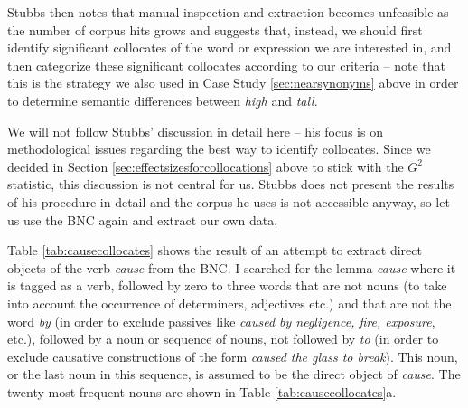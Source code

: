Stubbs then notes that manual inspection and extraction becomes unfeasible as the number of corpus hits grows and suggests that, instead, we should first identify significant collocates of the word or expression we are interested in, and then categorize these significant collocates according to our criteria -- note that this is the strategy we also used in Case Study \ref{sec:nearsynonyms} above in order to determine semantic differences between \textit{high} and \textit{tall}.

We will not follow Stubbs' discussion in detail here -- his focus is on methodological issues regarding the best way to identify collocates. Since we decided in Section \ref{sec:effectsizesforcollocations} above to stick with the $G^2$ statistic, this discussion is not central for us. Stubbs does not present the results of his procedure in detail and the corpus he uses is not accessible anyway, so let us use the BNC again and extract our own data.

Table \ref{tab:causecollocates} shows the result of an attempt to extract direct objects of the verb \textit{cause} from the BNC. I searched for the lemma \textit{cause} where it is tagged as a verb, followed by zero to three words that are not nouns (to take into account the occurrence of determiners, adjectives etc.) and that are not the word \textit{by} (in order to exclude passives like \textit{caused by negligence, fire, exposure}, etc.), followed by a noun or sequence of nouns, not followed by \textit{to} (in order to exclude causative constructions of the form \textit{caused the glass to break}). This noun, or the last noun in this sequence, is assumed to be the direct object of \textit{cause}. The twenty most frequent nouns are shown in Table \ref{tab:causecollocates}a.

